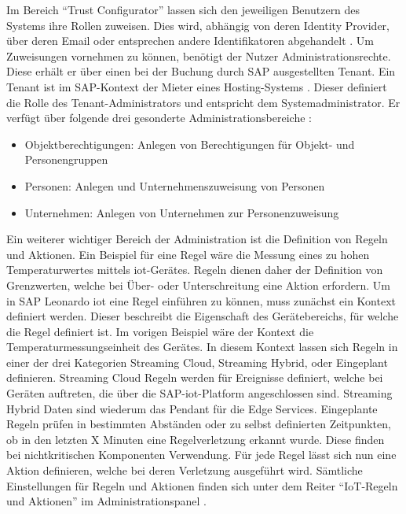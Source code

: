 \noindent Im Bereich "`Trust Configurator"' lassen sich den jeweiligen Benutzern des Systems ihre Rollen zuweisen. Dies wird, abhängig von deren Identity Provider, über deren Email oder entsprechen andere Identifikatoren abgehandelt \cite[Seite 209f]{Holtschulte20:IOS}. Um Zuweisungen vornehmen zu können, benötigt der Nutzer Administrationsrechte. Diese erhält er über einen bei der Buchung durch SAP ausgestellten Tenant. Ein Tenant ist im SAP-Kontext der Mieter eines Hosting-Systems \cite{TEN20:WWW}. Dieser definiert die Rolle des Tenant-Administrators und entspricht dem Systemadministrator. Er verfügt über folgende drei gesonderte Administrationsbereiche \cite[Seiten 220 - 221, 223]{Holtschulte20:IOS}:
\begin{itemize}
	\setlength{\itemsep}{1pt}
	\item{Objektberechtigungen: Anlegen von Berechtigungen für Objekt- und Personengruppen}
	\item{Personen: Anlegen und Unternehmenszuweisung von Personen}
	\item{Unternehmen: Anlegen von Unternehmen zur Personenzuweisung}
\end{itemize}
\noindent Ein weiterer wichtiger Bereich der Administration ist die Definition von Regeln und Aktionen. Ein Beispiel für eine Regel wäre die Messung eines zu hohen Temperaturwertes mittels \ac{iot}-Gerätes. Regeln dienen daher der Definition von Grenzwerten, welche bei Über- oder Unterschreitung eine Aktion erfordern. Um in SAP Leonardo \ac{iot} eine Regel einführen zu können, muss zunächst ein Kontext definiert werden. Dieser beschreibt die Eigenschaft des Gerätebereichs, für welche die Regel definiert ist. Im vorigen Beispiel wäre der Kontext die Temperaturmessungseinheit des Gerätes. In diesem Kontext lassen sich Regeln in einer der drei Kategorien Streaming Cloud, Streaming Hybrid, oder Eingeplant definieren. Streaming Cloud Regeln werden für Ereignisse definiert, welche bei Geräten auftreten, die über die SAP-\ac{iot}-Platform angeschlossen sind. Streaming Hybrid Daten sind wiederum das Pendant für die Edge Services. Eingeplante Regeln prüfen in bestimmten Abständen oder zu selbst definierten Zeitpunkten, ob in den letzten X Minuten eine Regelverletzung erkannt wurde. Diese finden bei nichtkritischen Komponenten Verwendung. Für jede Regel lässt sich nun eine Aktion definieren, welche bei deren Verletzung ausgeführt wird. Sämtliche Einstellungen für Regeln und Aktionen finden sich unter dem Reiter "`IoT-Regeln und Aktionen"' im Administrationspanel \cite[Seite 224ff]{Holtschulte20:IOS}.\\   

